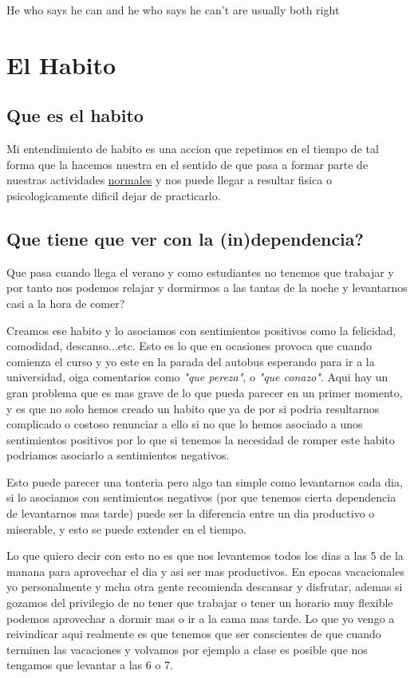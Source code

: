 \begin{savequote}
He who says he can and he who says he can't are usually both right
\end{savequote}

\chapter{El Habito}
\section{ Que es el habito }
Mi entendimiento de habito es una accion que repetimos en el tiempo \cite{lally2010habits} de tal forma que la hacemos nuestra en el sentido de que pasa a formar parte de nuestras actividades \underline{normales} y nos puede llegar a resultar fisica o psicologicamente dificil dejar de practicarlo. 
\section{ Que tiene que ver con la (in)dependencia?}
Que pasa cuando llega el verano y como estudiantes no tenemos que trabajar y por tanto nos podemos relajar y dormirmos a las tantas de la noche y levantarnos casi a la hora de comer?

Creamos ese habito y lo asociamos con sentimientos positivos como la felicidad, comodidad, descanso...etc. Esto es lo que en ocasiones provoca que cuando comienza el curso y yo este en la parada del autobus esperando para ir a la universidad, oiga comentarios como \textit{"que pereza"}, o \textit{"que conazo"}. Aqui hay un gran problema que es mas grave de lo que pueda parecer en un primer momento, y es que no solo hemos creado un habito que ya de por si podria resultarnos complicado o costoso renunciar a ello si no que lo hemos asociado a unos sentimientos positivos por lo que si tenemos la necesidad de romper este habito podriamos asociarlo a sentimientos negativos. 

Esto puede parecer una tonteria pero algo tan simple como levantarnos cada dia, si lo asociamos con sentimientos negativos (por que tenemos cierta dependencia de levantarnos mas tarde) puede ser la diferencia entre un dia productivo o miserable, y esto se puede extender en el tiempo.

Lo que quiero decir con esto no es que nos levantemos todos los dias a las 5 de la manana para aprovechar el dia y asi ser mas productivos. En epocas vacacionales yo personalmente y mcha otra gente recomienda descansar y disfrutar, ademas si gozamos del privilegio de no tener que trabajar o tener un horario muy flexible podemos aprovechar a dormir mas o ir a la cama mas tarde. Lo que yo vengo a reivindicar aqui realmente es que tenemos que ser conscientes de que cuando terminen las vacaciones y volvamos por ejemplo a clase es posible que nos tengamos que levantar a las 6 o 7.

